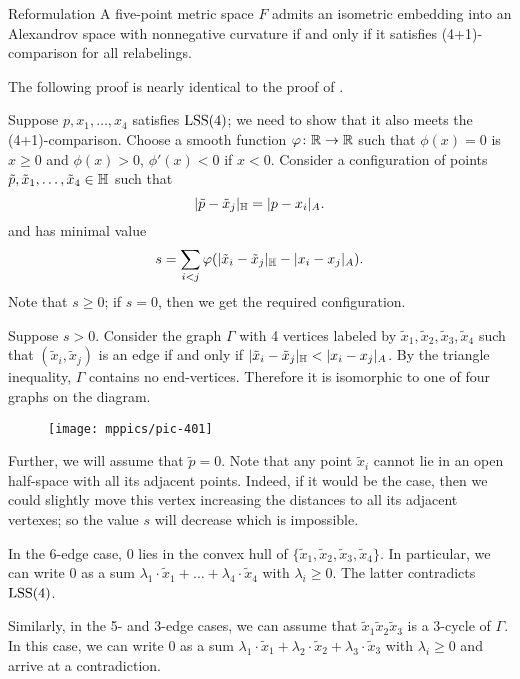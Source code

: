 \documentclass{article}
\begin{document}
\begin{thm}{Reformulation}\label{thm:main-(4+1)}
A five-point metric space $F$ admits an isometric embedding into an Alexandrov space with nonnegative curvature
if and only if it satisfies (4+1)-comparison for all relabelings.
\end{thm}

The following proof is nearly identical to the proof of \cite[Proposition 4.1]{lebedeva-petrunin-zolotov}.

Suppose $p,x_1,\dots,x_4$ satisfies $\mathrm{LSS}(4)$;
we need to show that it also meets the (4+1)-comparison.
Choose a smooth function $\varphi\colon\mathbb{R}\to \mathbb{R}$ such that $\phi(x)=0$ is $x\ge0$ and $\phi(x)>0$, $\phi'(x)<0$ if $x<0$.
Consider a configuration of points $\tilde p,\tilde x_1,\dots,\tilde x_4\in \mathbb H$ such that 
\[
|\tilde p-\tilde x_j|_{\mathbb H}=|p-x_i|_{A}.
\]
and has minimal value
\[
s=\sum_{i<j}\varphi(|\tilde x_i-\tilde x_j|_{\mathbb H}- |x_i-x_j|_{A}).
\]
Note that $s\ge0$;
if $s=0$, then we get the required configuration.

Suppose $s>0$.
Consider the graph $\Gamma$ with 4 vertices labeled by $\tilde x_1,\tilde x_2,\tilde x_3,\tilde x_4$ such that 
$(\tilde x_i,\tilde x_j)$ is an edge if and only if $|\tilde x_i-\tilde x_j|_{\HH}<|x_i-x_j|_{A}$.
By the triangle inequality, $\Gamma$ contains no end-vertices.
Therefore it is isomorphic to one of four graphs on the diagram.

\begin{figure}[ht!]
\centering
\texttt{[image: mppics/pic-401]}
\end{figure}

Further, we will assume that $\tilde p=0$.
Note that any point $\tilde x_i$ cannot lie in an open half-space with all its
adjacent points.
Indeed, if it would be the case, then we could slightly move this
vertex increasing the distances to all its adjacent vertexes;
so the value $s$ will decrease which is impossible.

In the 6-edge case, $0$ lies in the convex hull of $\{\tilde x_1,\tilde x_2,\tilde x_3,\tilde x_4\}$.
In particular, we can write $0$ as a sum $\lambda_1\cdot \tilde x_1+\dots+\lambda_4\cdot\tilde x_4$ with $\lambda_i\ge0$.
The latter contradicts $\mathrm{LSS}(4)$.

Similarly, in the 5- and 3-edge cases, we can assume that $\tilde x_1\tilde x_2\tilde x_3$ is a 3-cycle of $\Gamma$.
In this case, we can write $0$ as a sum $\lambda_1\cdot \tilde x_1+\lambda_2\cdot\tilde x_2+\lambda_3\cdot\tilde x_3$ with $\lambda_i\ge0$ and arrive at a contradiction.
\end{document}
